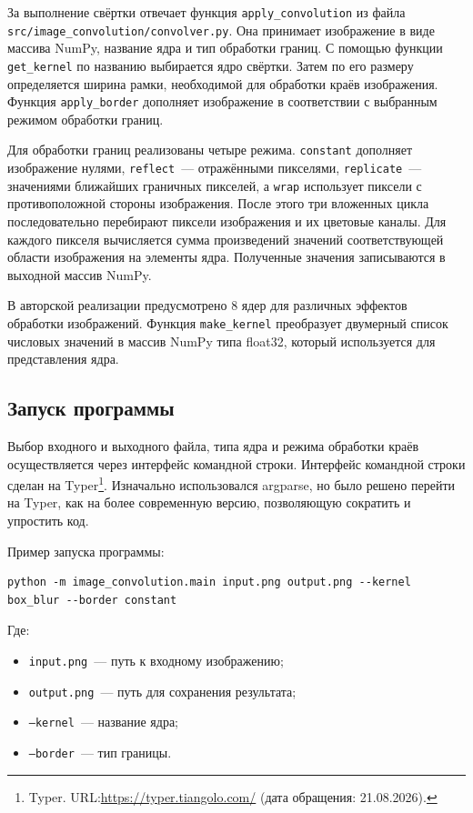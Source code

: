 \documentclass[a4paper]{article}
\begin{document}
За выполнение свёртки отвечает функция \texttt{apply\_convolution} из файла \texttt{src/image\_convolution/convolver.py}. Она принимает изображение в виде массива NumPy, название ядра и тип обработки границ. С помощью функции \texttt{get\_kernel} по названию выбирается ядро свёртки. Затем по его размеру определяется ширина рамки, необходимой для обработки краёв изображения. Функция \texttt{apply\_border} дополняет изображение в соответствии с выбранным режимом обработки границ.

Для обработки границ реализованы четыре режима. \texttt{constant} дополняет изображение нулями, \texttt{reflect}~--- отражёнными пикселями, \texttt{replicate}~--- значениями ближайших граничных пикселей, а \texttt{wrap} использует пиксели с противоположной стороны изображения. После этого три вложенных цикла последовательно перебирают пиксели изображения и их цветовые каналы. Для каждого пикселя вычисляется сумма произведений значений соответствующей области изображения на элементы ядра. Полученные значения записываются в выходной массив NumPy.

В авторской реализации предусмотрено 8 ядер для различных эффектов обработки изображений. Функция \texttt{make\_kernel} преобразует двумерный список числовых значений в массив NumPy типа float32, который используется для представления ядра.

\subsection{Запуск программы}

Выбор входного и выходного файла, типа ядра и режима обработки краёв осуществляется через интерфейс командной строки. Интерфейс командной строки сделан на Typer\footnote{ Typer. URL:\url{https://typer.tiangolo.com/} (дата обращения: 21.08.2026).}. Изначально использовался argparse, но было решено перейти на Typer, как на более современную версию, позволяющую сократить и упростить код.

Пример запуска программы:
\begin{verbatim}
python -m image_convolution.main input.png output.png --kernel box_blur --border constant
\end{verbatim}

Где:
\begin{itemize}
    \item \texttt{input.png}~--- путь к входному изображению;
    \item \texttt{output.png}~--- путь для сохранения результата;
    \item \texttt{--kernel}~--- название ядра;
    \item \texttt{--border}~--- тип границы.
\end{itemize}
\end{document}
